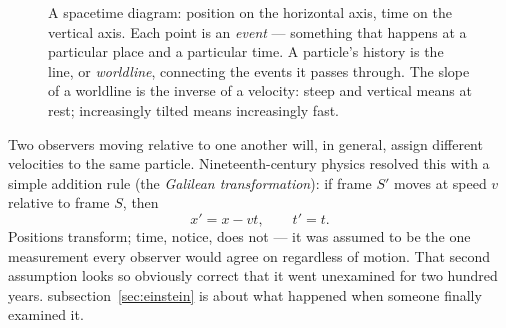 \begin{figure}[h]
\centering
{}
\caption{A spacetime diagram: position on the horizontal axis, time on the vertical axis. Each point is an \emph{event} --- something that happens at a particular place and a particular time. A particle's history is the line, or \emph{worldline}, connecting the events it passes through. The slope of a worldline is the inverse of a velocity: steep and vertical means at rest; increasingly tilted means increasingly fast.}
\label{fig:worldline}
\end{figure}

Two observers moving relative to one another will, in general, assign different velocities to the same particle. Nineteenth-century physics resolved this with a simple addition rule (the \emph{Galilean transformation}): if frame $S'$ moves at speed $v$ relative to frame $S$, then
\[
  x' = x - vt, \qquad t' = t.
\]
Positions transform; time, notice, does not --- it was assumed to be the one measurement every observer would agree on regardless of motion. That second assumption looks so obviously correct that it went unexamined for two hundred years. subsection~\ref{sec:einstein} is about what happened when someone finally examined it.

